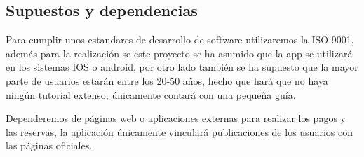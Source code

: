 \documentclass[11pt]{article}
\begin{document}
\subsection{Supuestos y dependencias}


Para cumplir unos estandares de desarrollo de software utilizaremos la ISO 9001, además para la realización se este proyecto se ha asumido que la app  se utilizará en los sistemas IOS o android, por otro lado también se ha supuesto que la mayor parte de usuarios estarán entre los 20-50 años, hecho que hará que no haya ningún tutorial extenso, únicamente contará con una pequeña guía.

Dependeremos de páginas web o aplicaciones externas para realizar los pagos y las reservas, la aplicación únicamente vinculará publicaciones de los usuarios con las páginas oficiales. 
\end{document}
